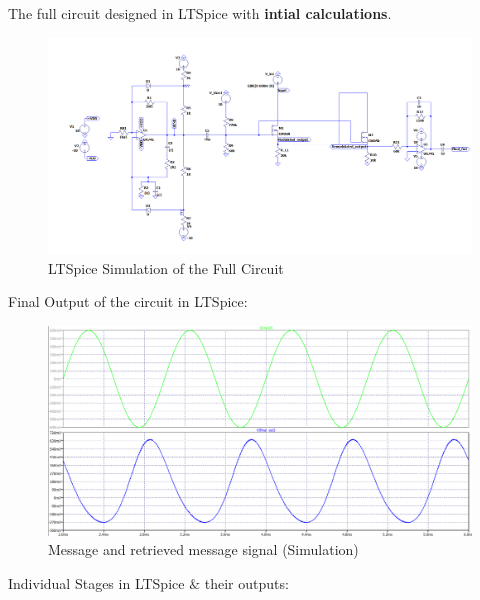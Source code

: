 \documentclass[conference]{IEEEtran}
\begin{document}
The full circuit designed in LTSpice with \textbf{intial calculations}.
\begin{figure}
    \centering
    \includegraphics[width=1\linewidth]{Images/Full_circuit_ltspice.png}
    \caption{LTSpice Simulation of the Full Circuit}
\end{figure}
Final Output of the circuit in LTSpice:
\begin{figure}
    \centering
    \includegraphics[width=1\linewidth]{Images/final_out_ltspice.png}
    \caption{Message and retrieved message signal (Simulation)}
\end{figure}

Individual Stages in LTSpice $ \& $ their outputs:
\end{document}

